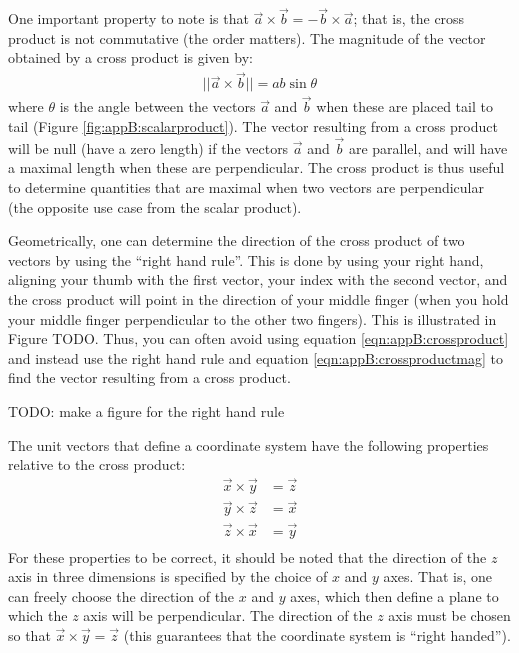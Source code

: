 One important property to note is that $\vec a \times \vec b = -\vec b \times \vec a$; that is, the cross product is not commutative (the order matters). The magnitude of the vector obtained by a cross product is given by:
\begin{align}
\label{eqn:appB:crossproductmag}
||\vec a \times \vec b ||=ab\sin\theta
\end{align}
where $\theta$ is the angle between the vectors $\vec a$ and $\vec b$ when these are placed tail to tail (Figure \ref{fig:appB:scalarproduct}). The vector resulting from a cross product will be null (have a zero length) if the vectors $\vec a$ and $\vec b$ are parallel, and will have a maximal length when these are perpendicular. The cross product is thus useful to determine quantities that are maximal when two vectors are perpendicular (the opposite use case from the scalar product). 

Geometrically, one can determine the direction of the cross product of two vectors by using the ``right hand rule''. This is done by using your right hand, aligning your thumb with the first vector, your index with the second vector, and the cross product will point in the direction of your middle finger (when you hold your middle finger perpendicular to the other two fingers). This is illustrated in Figure TODO. Thus, you can often avoid using equation \ref{eqn:appB:crossproduct} and instead use the right hand rule and equation \ref{eqn:appB:crossproductmag} to find the vector resulting from a cross product.

TODO: make a figure for the right hand rule

The unit vectors that define a coordinate system have the following properties relative to the cross product:
\begin{align*}
\vec x \times \vec y &= \vec z\\
\vec y \times \vec z &= \vec x\\
\vec z \times \vec x &= \vec y\\
\end{align*}
For these properties to be correct, it should be noted that the direction of the $z$ axis in three dimensions is specified by the choice of $x$ and $y$ axes. That is, one can freely choose the direction of the $x$ and $y$ axes, which then define a plane to which the $z$ axis will be perpendicular. The direction of the $z$ axis must be chosen so that $\vec x \times \vec y = \vec z$ (this guarantees that the coordinate system is ``right handed''). 

